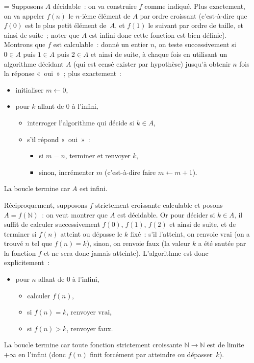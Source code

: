 \documentclass[12pt,a4paper]{article}
\theoremstyle{definition}
\newif\ifcorrige
\newenvironment{corrige}%
{\ifcorrige\relax\else\setbox0=\vbox\bgroup\fi%
\smallbreak\footnotesize\noindent{\underbar{\textit{Corrigé.}}\quad}}
{{\hbox{}\nobreak\hfill\checkmark}%
\ifcorrige\relax\else\egroup\fi\par}
\begin{document}
\begin{corrige}
Supposons $A$ décidable : on va construire $f$ comme indiqué.  Plus
exactement, on va appeler $f(n)$ le $n$-ième élément de $A$ par ordre
croissant (c'est-à-dire que $f(0)$ est le plus petit élément de $A$,
et $f(1)$ le suivant par ordre de taille, et ainsi de suite ; noter
que $A$ est infini donc cette fonction est bien définie).  Montrons
que $f$ est calculable : donné un entier $n$, on teste successivement
si $0\in A$ puis $1\in A$ puis $2\in A$ et ainsi de suite, à chaque
fois en utilisant un algorithme décidant $A$ (qui est censé exister
par hypothèse) jusqu'à obtenir $n$ fois la réponse « oui » ; plus
exactement :
\begin{itemize}
\item initialiser $m \leftarrow 0$,
\item pour $k$ allant de $0$ à l'infini,
\begin{itemize}
\item interroger l'algorithme qui décide si $k\in A$,
\item s'il répond « oui » :
\begin{itemize}
\item si $m=n$, terminer et renvoyer $k$,
\item sinon, incrémenter $m$ (c'est-à-dire faire $m \leftarrow m+1$).
\end{itemize}
\end{itemize}
\end{itemize}
La boucle termine car $A$ est infini.

Réciproquement, supposons $f$ strictement croissante calculable et
posons $A = f(\mathbb{N})$ : on veut montrer que $A$ est décidable.
Or pour décider si $k \in A$, il suffit de calculer successivement
$f(0)$, $f(1)$, $f(2)$ et ainsi de suite, et de terminer si $f(n)$
atteint ou dépasse le $k$ fixé : s'il l'atteint, on renvoie vrai (on a
trouvé $n$ tel que $f(n)=k$), sinon, on renvoie faux (la valeur $k$ a
été sautée par la fonction $f$ et ne sera donc jamais atteinte).
L'algorithme est donc explicitement :
\begin{itemize}
\item pour $n$ allant de $0$ à l'infini,
\begin{itemize}
\item calculer $f(n)$,
\item si $f(n) = k$, renvoyer vrai,
\item si $f(n) > k$, renvoyer faux.
\end{itemize}
\end{itemize}
La boucle termine car toute fonction strictement croissante
$\mathbb{N}\to\mathbb{N}$ est de limite $+\infty$ en l'infini (donc
$f(n)$ finit forcément par atteindre ou dépasser $k$).
\end{corrige}
\end{document}

